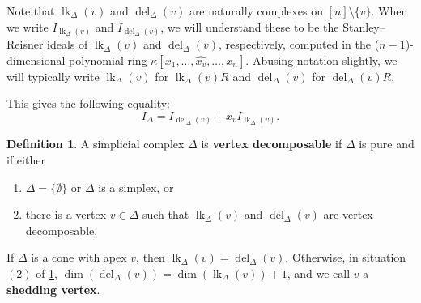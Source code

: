 \documentclass[12pt, reqno]{amsart}
\numberwithin{equation}{section}
\newtheorem{Main Conjecture}[theorem]{Main Conjecture}
\theoremstyle{definition}
\newtheorem{defn}[theorem]{Definition}
\theoremstyle{plain}
\DeclareMathOperator{\lk}{lk}
\DeclareMathOperator{\del}{del}
\begin{document}
Note that $\lk_\Delta(v)$ and $\del_\Delta(v)$ are naturally complexes on $[n] \setminus \{v\}$.  When we write $I_{\lk_\Delta(v)}$ and $I_{\del_\Delta(v)}$, we will understand these to be the Stanley--Reisner ideals of $\lk_\Delta(v)$ and $\del_\Delta(v)$, respectively, computed in the ($n-1$)-dimensional polynomial ring $\kappa[x_1, \ldots, \widehat{x_v}, \dots, x_n]$.  Abusing notation slightly, we will typically write $\lk_\Delta(v)$ for $\lk_\Delta(v)R$ and $\del_\Delta(v)$ for $\del_\Delta(v)R$.

This gives the following equality: 
\begin{equation}\label{eq:linkdel}  I_{\Delta} = I_{\del_\Delta(v)}+x_vI_{\lk_\Delta(v)}.
\end{equation}

\begin{defn}
 \label{def:vertex decomposable}
A simplicial complex $\Delta$ is {\bf vertex decomposable} if $\Delta$ is pure and if either
\begin{enumerate}
    \item $\Delta = \{\emptyset\}$ or $\Delta$ is a simplex, or
    \item there is a vertex $v\in \Delta$ such that $\lk_\Delta(v)$ and $\del_{\Delta}(v)$ are vertex decomposable. 
\end{enumerate}
\end{defn}

If $\Delta$ is a cone with apex $v$, then $\lk_\Delta(v) = \del_\Delta(v)$. Otherwise, in situation $(2)$ of  \cref{def:vertex decomposable}, $\dim(\del_\Delta(v)) = \dim(\lk_\Delta(v))+1$, and we call $v$ a {\bf shedding vertex}.
\end{document}
